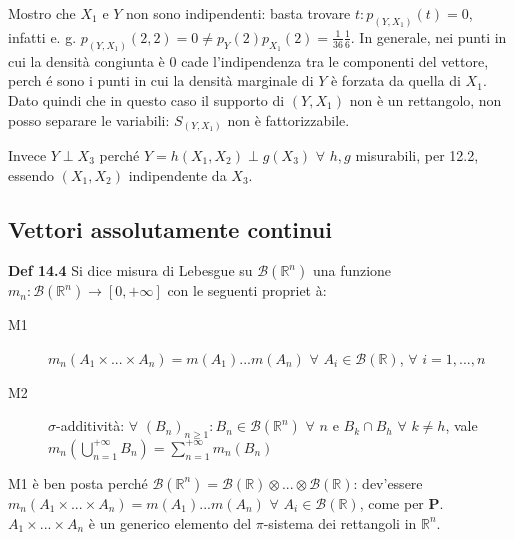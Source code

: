 \documentclass{article}
\begin{document}
\begin{enumerate}
Mostro che $X_{1}$ e $Y$ non sono indipendenti: basta trovare $t:p_{\left(
Y,X_{1}\right) }\left( t\right) =0$, infatti e. g. $p_{\left( Y,X_{1}\right)
}\left( 2,2\right) =0\neq p_{Y}\left( 2\right) p_{X_{1}}\left( 2\right) =%
\frac{1}{36}\frac{1}{6}$. In generale, nei punti in cui la densit\`{a}
congiunta \`{e} $0$ cade l'indipendenza tra le componenti del vettore, perch%
\'{e} sono i punti in cui la densit\`{a} marginale di $Y$ \`{e} forzata da
quella di $X_{1}$. Dato quindi che in questo caso il supporto di $\left(
Y,X_{1}\right) $ non \`{e} un rettangolo, non posso separare le variabili: $%
S_{\left( Y,X_{1}\right) }$ non \`{e} fattorizzabile.

Invece $Y\perp X_{3}$ perch\'{e} $Y=h\left( X_{1},X_{2}\right) \perp g\left(
X_{3}\right) $ $\forall $ $h,g$ misurabili, per 12.2, essendo $\left(
X_{1},X_{2}\right) $ indipendente da $X_{3}$.
\end{enumerate}

\subsection{Vettori assolutamente continui}

\textbf{Def 14.4} Si dice misura di Lebesgue su $\mathcal{B}\left( 
\mathbb{R}
^{n}\right) $ una funzione $m_{n}:\mathcal{B}\left( 
\mathbb{R}
^{n}\right) \rightarrow \left[ 0,+\infty \right] $ con le seguenti propriet%
\`{a}:

\begin{description}
\item[M1] $m_{n}\left( A_{1}\times ...\times A_{n}\right) =m\left(
A_{1}\right) ...m\left( A_{n}\right) $ $\forall $ $A_{i}\in \mathcal{B}%
\left( 
\mathbb{R}
\right) $, $\forall $ $i=1,...,n$

\item[M2] $\sigma $-additivit\`{a}: $\forall $ $\left( B_{n}\right) _{n\geq
1}:B_{n}\in \mathcal{B}\left( 
\mathbb{R}
^{n}\right) $ $\forall $ $n$ e $B_{k}\cap B_{h}$ $\forall $ $k\neq h$, vale $%
m_{n}\left( \bigcup_{n=1}^{+\infty }B_{n}\right) =\sum_{n=1}^{+\infty
}m_{n}\left( B_{n}\right) $
\end{description}

M1 \`{e} ben posta perch\'{e} $\mathcal{B}\left( 
\mathbb{R}
^{n}\right) =\mathcal{B}\left( 
\mathbb{R}
\right) \otimes ...\otimes \mathcal{B}\left( 
\mathbb{R}
\right) $: dev'essere $m_{n}\left( A_{1}\times ...\times A_{n}\right)
=m\left( A_{1}\right) ...m\left( A_{n}\right) $ $\forall $ $A_{i}\in 
\mathcal{B}\left( 
\mathbb{R}
\right) $, come per $\mathbf{P}$. $A_{1}\times ...\times A_{n}$ \`{e} un
generico elemento del $\pi $-sistema dei rettangoli in $%
\mathbb{R}
^{n}$.
\end{document}
